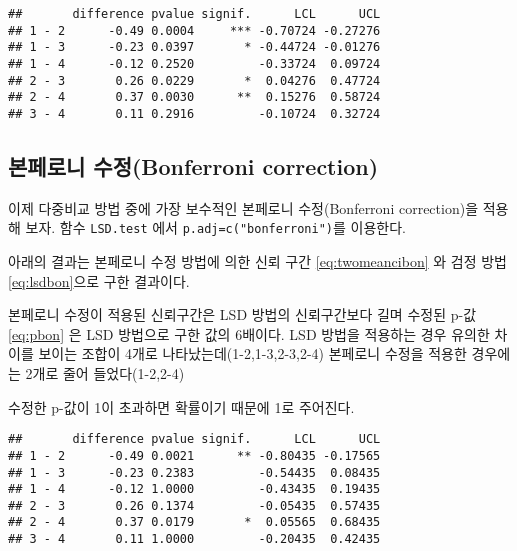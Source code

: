 \documentclass[
]{book}
\newenvironment{Shaded}{\begin{snugshade}}{\end{snugshade}}
\newcommand{\AttributeTok}[1]{\textcolor[rgb]{0.77,0.63,0.00}{#1}}
\newcommand{\ConstantTok}[1]{\textcolor[rgb]{0.00,0.00,0.00}{#1}}
\newcommand{\FloatTok}[1]{\textcolor[rgb]{0.00,0.00,0.81}{#1}}
\newcommand{\FunctionTok}[1]{\textcolor[rgb]{0.00,0.00,0.00}{#1}}
\newcommand{\NormalTok}[1]{#1}
\newcommand{\OtherTok}[1]{\textcolor[rgb]{0.56,0.35,0.01}{#1}}
\newcommand{\SpecialCharTok}[1]{\textcolor[rgb]{0.00,0.00,0.00}{#1}}
\newcommand{\StringTok}[1]{\textcolor[rgb]{0.31,0.60,0.02}{#1}}
\begin{document}
\begin{verbatim}
##       difference pvalue signif.      LCL      UCL
## 1 - 2      -0.49 0.0004     *** -0.70724 -0.27276
## 1 - 3      -0.23 0.0397       * -0.44724 -0.01276
## 1 - 4      -0.12 0.2520         -0.33724  0.09724
## 2 - 3       0.26 0.0229       *  0.04276  0.47724
## 2 - 4       0.37 0.0030      **  0.15276  0.58724
## 3 - 4       0.11 0.2916         -0.10724  0.32724
\end{verbatim}

\hypertarget{uxbcf8uxd398uxb85cuxb2c8-uxc218uxc815bonferroni-correction}{%
\subsection{본페로니 수정(Bonferroni correction)}\label{uxbcf8uxd398uxb85cuxb2c8-uxc218uxc815bonferroni-correction}}

이제 다중비교 방법 중에 가장 보수적인 본페로니 수정(Bonferroni
correction)을 적용해 보자. 함수 \texttt{LSD.test} 에서
\texttt{p.adj=c("bonferroni")}를 이용한다.

아래의 결과는 본페로니 수정 방법에 의한 신뢰 구간
\eqref{eq:twomeancibon} 와 검정 방법 \eqref{eq:lsdbon}으로 구한 결과이다.

본페로니 수정이 적용된 신뢰구간은 LSD 방법의
신뢰구간보다 길며 수정된 p-값 \eqref{eq:pbon} 은 LSD 방법으로 구한 값의 6배이다. LSD 방법을
적용하는 경우 유의한 차이를 보이는 조합이 4개로
나타났는데(1-2,1-3,2-3,2-4) 본페로니 수정을 적용한 경우에는 2개로 줄어
들었다(1-2,2-4)

수정한 p-값이 1이 초과하면 확률이기 때문에 1로 주어진다.

\begin{Shaded}
\end{Shaded}

\begin{verbatim}
##       difference pvalue signif.      LCL      UCL
## 1 - 2      -0.49 0.0021      ** -0.80435 -0.17565
## 1 - 3      -0.23 0.2383         -0.54435  0.08435
## 1 - 4      -0.12 1.0000         -0.43435  0.19435
## 2 - 3       0.26 0.1374         -0.05435  0.57435
## 2 - 4       0.37 0.0179       *  0.05565  0.68435
## 3 - 4       0.11 1.0000         -0.20435  0.42435
\end{verbatim}
\end{document}
